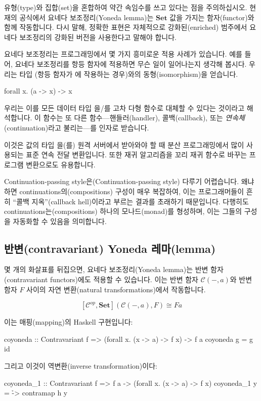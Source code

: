 \documentclass[DaoFP]{subfiles}
\begin{document}
유형(type)와 집합(set)을 혼합하여 약간 속임수를 쓰고 있다는 점을 주의하십시오. 현재의 공식에서 요네다 보조정리(Yoneda lemma)는 $\mathbf{Set}$ 값을 가지는 함자(functor)와 함께 작동합니다. 다시 말해, 정확한 표현은 자체적으로 강화된(enriched) 범주에서 요네다 보조정리의 강화된 버전을 사용한다고 말해야 합니다.

요네다 보조정리는 프로그래밍에서 몇 가지 흥미로운 적용 사례가 있습니다. 예를 들어, 요네다 보조정리를 항등 함자에 적용하면 무슨 일이 일어나는지 생각해 봅시다. 우리는 타입  (항등 함자가 에 작용하는 경우)와의 동형(isomorphism)을 얻습니다.
\begin{haskell}
forall x. (a -> x) -> x
\end{haskell}
우리는 이를 모든 데이터 타입 을/를 고차 다형 함수로 대체할 수 있다는 것이라고 해석합니다. 이 함수는 또 다른 함수---핸들러(handler), 콜백(callback), 또는 \emph{연속체}(continuation)라고 불리는---를 인자로 받습니다.

이것은 값의 타입 을(를) 원격 서버에서 받아와야 할 때 분산 프로그래밍에서 많이 사용되는 표준 연속 전달 변환입니다. 또한 재귀 알고리즘을 꼬리 재귀 함수로 바꾸는 프로그램 변환으로도 유용합니다.

Continuation-passing style은(Continuation-passing style) 다루기 어렵습니다. 왜냐하면 continuations의(compositions) 구성이 매우 복잡하여, 이는 프로그래머들이 흔히 ``콜백 지옥''(callback hell)이라고 부르는 결과를 초래하기 때문입니다. 다행히도 continuations는(compositions) 하나의 모나드(monad)를 형성하며, 이는 그들의 구성을 자동화할 수 있음을 의미합니다.

\subsection{반변(contravariant) Yoneda 레마(lemma)}

몇 개의 화살표를 뒤집으면, 요네다 보조정리(Yoneda lemma)는 반변 함자(contravariant functors)에도 적용할 수 있습니다. 이는 반변 함자 $\mathcal{C}(-, a)$와 반변 함자 $F$ 사이의 자연 변환(natural transformations)에서 작동합니다.

\[ [\mathcal{C}^{op}, \mathbf{Set}]( \mathcal{C}(-, a), F) \cong F a \]

이는 매핑(mapping)의 Haskell 구현입니다:
\begin{haskell}
coyoneda :: Contravariant f => (forall x. (x -> a) -> f x) -> f a
coyoneda g = g id
\end{haskell}
그리고 이것이 역변환(inverse transformation)이다:
\begin{haskell}
coyoneda_1 :: Contravariant f => f a -> (forall x. (x -> a) -> f x)
coyoneda_1 y = \h -> contramap h y
\end{haskell}
\end{document}
